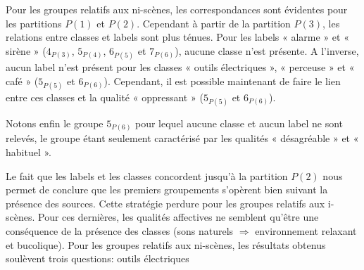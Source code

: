 Pour les groupes relatifs aux ni-scènes, les correspondances sont évidentes pour les partitions $P(1)$ et $P(2)$. Cependant à partir de la partition $P(3)$, les relations entre classes et labels sont plus ténues. Pour les labels « alarme » et « sirène » ($4_{P(3)}$, $5_{P(4)}$, $6_{P(5)}$ et $7_{P(6)}$), aucune classe n'est présente. A l'inverse, aucun label n'est présent pour les classes « outils électriques », « perceuse » et  « café » ($5_{P(5)}$ et $6_{P(6)}$). Cependant, il est possible maintenant de faire le lien entre ces classes et la qualité « oppressant » ($5_{P(5)}$ et $6_{P(6)}$).

Notons enfin le groupe $5_{P(6)}$ pour lequel aucune classe et aucun label ne sont relevés, le groupe étant seulement caractérisé par les qualités « désagréable » et « habituel ».

Le fait que les labels et les classes concordent jusqu'à la partition $P(2)$ nous permet de conclure que les premiers groupements s'opèrent bien suivant la présence des sources. Cette stratégie perdure pour les groupes relatifs aux i-scènes. Pour ces dernières, les qualités affectives ne semblent qu'être une conséquence de la présence des classes (sons naturels $\Rightarrow$ environnement relaxant et bucolique). Pour les groupes relatifs aux ni-scènes, les résultats obtenus soulèvent trois questions:
outils électriques 
